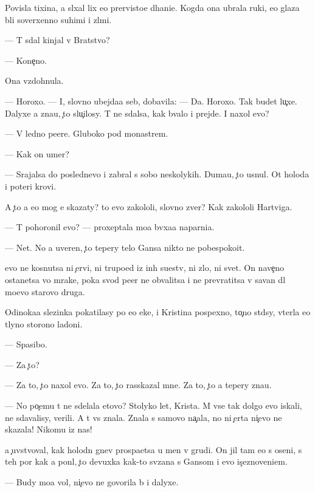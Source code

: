 \documentclass[10pt]{book}
\begin{document}
Povisla tixina, {\y}a sl{\yi}xal lix {\y}e{\y}o prer{\yi}visto{\y}e d{\yi}hani{\y}e. Kogda ona ubrala ruki, {\y}e{\y}o glaza b{\yi}li soverxenno suhimi i zl{\yi}mi.

— T{\yi} sdal kinjal v Bratstvo?

— Kone{\c}no.

Ona vzdohnula.

— Horoxo. — I, slovno ubejda{\y}a seb{\ia}, dobavila: — Da. Horoxo. Tak budet lu{\c}xe. Dalyxe {\y}a zna{\y}u, {\c}to slu{\c}ilosy. T{\yi} ne sdalsa, kak b{\yi}valo i prejde. I naxol {\y}evo?

— V led{\ia}no{\y} pe{\x}ere. Gluboko pod monast{\yi}rem.

— Kak on umer?

— Srajalsa do poslednevo i zabral s sobo{\y} neskolykih. Duma{\y}u, {\c}to usnul. Ot holoda i poteri krovi.

A {\c}to {\y}a {\y}e{\x}o mog {\y}e{\y} skazaty? {\C}to {\y}evo zakololi, slovno zver{\ia}? Kak zakololi Hartviga.

— T{\yi} pohoronil {\y}evo? — proxeptala mo{\y}a b{\yi}vxa{\y}a naparni{\q}a.

— Net. No {\y}a uveren, {\c}to tepery telo Gansa nikto ne pobespoko{\y}it.

{\Y}evo ne kosnutsa ni {\c}ervi, ni trupo{\y}ed{\yi} iz in{\yi}h su{\x}estv, ni zlo, ni svet. On nave{\c}no ostanetsa vo mrake, poka svod pe{\x}er{\yi} ne obvalitsa i ne prevratitsa v savan dl{\ia} mo{\y}evo starovo druga.

Odinoka{\y}a slezinka pokatilasy po {\y}e{\y}o {\x}eke, i Kristina pospexno, to{\c}no st{\yi}d{\ia}sy, v{\yi}terla {\y}e{\y}o t{\yi}lyno{\y} storono{\y} ladoni.

— Spasibo.

— Za {\c}to?

— Za to, {\c}to naxol {\y}evo. Za to, {\c}to rasskazal mne. Za to, {\c}to {\y}a tepery zna{\y}u.

— No po{\c}emu t{\yi} ne sdelala etovo? Stolyko let, Krista. M{\yi} vse tak dolgo {\y}evo iskali, ne sdavalisy, verili. A t{\yi} vs{\e} znala. Znala s samovo na{\c}ala, no ni {\c}erta ni{\c}evo ne skazala! Nikomu iz nas!

{\Y}a {\c}uvstvoval, kak holodn{\yi}{\y} gnev pros{\yi}pa{\y}etsa u men{\ia} v grudi. On jil tam {\y}e{\x}o s oseni, s teh por kak {\y}a pon{\ia}l, {\c}to devuxka kak-to sv{\ia}zana s Gansom i {\y}evo is{\c}eznoveni{\y}em.

— Budy mo{\y}a vol{\ia}, ni{\c}evo ne govorila b{\yi} i dalyxe.
\end{document}
